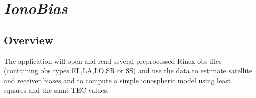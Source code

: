 %
%


\section{\emph{IonoBias}}
\subsection{Overview}
The application will open and read several preprocessed Rinex obs files
 (containing obs types EL,LA,LO,SR or SS) and use the data to estimate
 satellite and receiver biases and to compute a simple ionospheric model
 using least squares and the slant TEC values.

